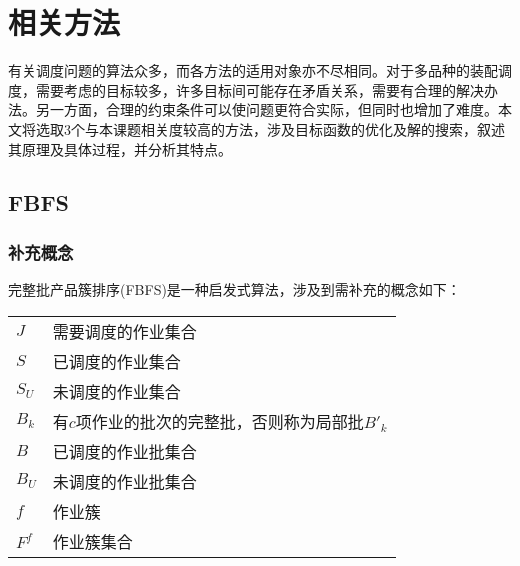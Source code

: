 \section{相关方法}
有关调度问题的算法众多，而各方法的适用对象亦不尽相同。对于多品种的装配调度，需要考虑的目标较多，许多目标间可能存在矛盾关系，需要有合理的解决办法。另一方面，合理的约束条件可以使问题更符合实际，但同时也增加了难度。本文将选取3个与本课题相关度较高的方法，涉及目标函数的优化及解的搜索，叙述其原理及具体过程，并分析其特点。
\subsection{FBFS}
\subsubsection{补充概念}
完整批产品簇排序(FBFS)是一种启发式算法，涉及到需补充的概念如下：

\begin{tabular}{ll}
$J$ &需要调度的作业集合\\
$S$ &已调度的作业集合\\
$S_U$ &未调度的作业集合\\
$B_k$& 有$c$项作业的批次的完整批，否则称为局部批$B'_k$\\
$B$ & 已调度的作业批集合\\
$B_U$ &未调度的作业批集合\\
$f$ &作业簇\\
$F^f$ &作业簇集合
\end{tabular}

